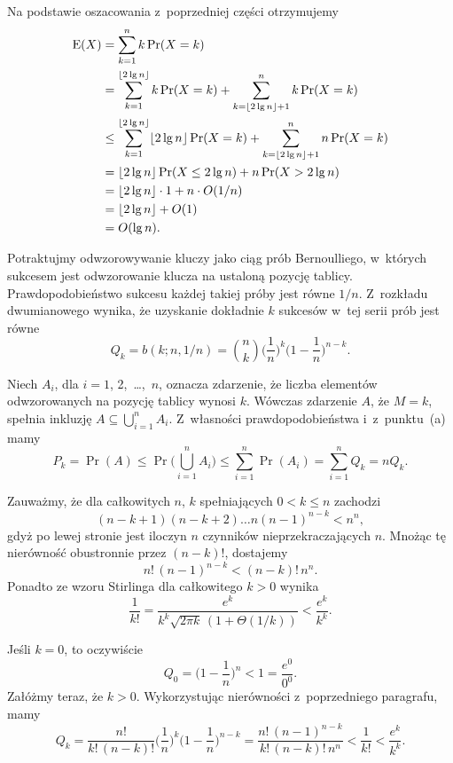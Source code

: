 \subproblem %
Na podstawie oszacowania z~poprzedniej części otrzymujemy
\begin{align*}
	\operatorname{E}(X) &= \sum_{k=1}^nk\Pr(X=k) \\
	&= \sum_{k=1}^{\lfloor2\lg n\rfloor}k\Pr(X=k)+\sum_{k=\lfloor2\lg n\rfloor+1}^nk\Pr(X=k) \\
	&\le \sum_{k=1}^{\lfloor2\lg n\rfloor}\lfloor2\lg n\rfloor\Pr(X=k)+\sum_{k=\lfloor2\lg n\rfloor+1}^nn\Pr(X=k) \\
	&= \lfloor2\lg n\rfloor\Pr(X\le2\lg n)+n\Pr(X>2\lg n) \\
	&= \lfloor2\lg n\rfloor\cdot1+n\cdot O(1/n) \\
	&= \lfloor2\lg n\rfloor+O(1) \\
	&= O(\lg n).
\end{align*}


\subproblem %
Potraktujmy odwzorowywanie kluczy jako ciąg prób Bernoulliego, w~których sukcesem jest odwzorowanie klucza na ustaloną pozycję tablicy.
Prawdopodobieństwo sukcesu każdej takiej próby jest równe $1/n$.
Z~rozkładu dwumianowego wynika, że uzyskanie dokładnie $k$ sukcesów w~tej serii prób jest równe
\[
	Q_k = b(k;n,1/n) = \binom{n}{k}\biggl(\frac{1}{n}\biggr)^k\biggl(1-\frac{1}{n}\biggr)^{n-k}.
\]

\subproblem %
Niech $A_i$, dla $i=1$, 2,~\dots,~$n$, oznacza zdarzenie, że liczba elementów odwzorowanych na  pozycję tablicy wynosi $k$.
Wówczas zdarzenie $A$, że $M=k$, spełnia inkluzję $A\subseteq\bigcup_{i=1}^nA_i$.
Z~własności prawdopodobieństwa i~z~punktu~(a) mamy
\[
	P_k = \Pr(A) \le \Pr\biggl(\bigcup_{i=1}^nA_i\biggr) \le \sum_{i=1}^n\Pr(A_i) = \sum_{i=1}^nQ_k = nQ_k.
\]

\subproblem %
Zauważmy, że dla całkowitych $n$, $k$ spełniających $0<k\le n$ zachodzi
\[
	(n-k+1)(n-k+2)\dots n(n-1)^{n-k} < n^n,
\]
gdyż po lewej stronie jest iloczyn $n$ czynników nieprzekraczających $n$.
Mnożąc tę nierówność obustronnie przez $(n-k)!$, dostajemy
\[
	n!\,(n-1)^{n-k} < (n-k)!\,n^n.
\]
Ponadto ze wzoru Stirlinga dla całkowitego $k>0$ wynika
\[
	\frac{1}{k!} = \frac{e^k}{k^k\sqrt{2\pi k}\,(1+\Theta(1/k))} < \frac{e^k}{k^k}.
\]

Jeśli $k=0$, to oczywiście
\[
	Q_0 = \biggl(1-\frac{1}{n}\biggr)^n < 1 = \frac{e^0}{0^0}.
\]
Załóżmy teraz, że $k>0$.
Wykorzystując nierówności z~poprzedniego paragrafu, mamy
\[
	Q_k = \frac{n!}{k!\,(n-k)!}\biggl(\frac{1}{n}\biggr)^k\biggl(1-\frac{1}{n}\biggr)^{n-k} = \frac{n!\,(n-1)^{n-k}}{k!\,(n-k)!\,n^n} < \frac{1}{k!} < \frac{e^k}{k^k}.
\]

